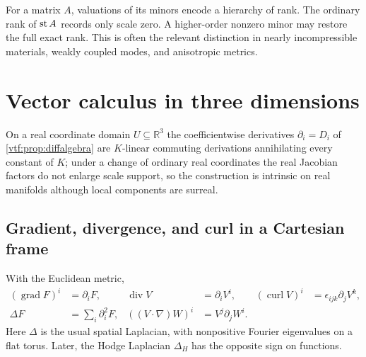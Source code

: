 \documentclass[11pt,letterpaper]{article}
\theoremstyle{definition}
\theoremstyle{remark}
\newcommand{\R}{\mathbb R}\newcommand{\C}{\mathbb C}
\newcommand{\grad}{\operatorname{grad}}\newcommand{\Div}{\operatorname{div}}
\newcommand{\curl}{\operatorname{curl}}
\begin{document}
For a matrix $A$, valuations of its minors encode a hierarchy of rank. The ordinary rank of $\operatorname{st} A$ records only scale zero. A higher-order nonzero minor may restore the full exact rank. This is often the relevant distinction in nearly incompressible materials, weakly coupled modes, and anisotropic metrics.

\section{Vector calculus in three dimensions}\label{vtf:3d:sec:calculus}

On a real coordinate domain $U\subseteq\R^3$ the coefficientwise derivatives
$\partial_i=D_i$ of \cref{vtf:prop:diffalgebra} are $K$-linear commuting
derivations annihilating every constant of $K$; under a change of ordinary real
coordinates the real Jacobian factors do not enlarge scale support, so the
construction is intrinsic on real manifolds although local components are
surreal.

\subsection{Gradient, divergence, and curl in a Cartesian frame}
With the Euclidean metric,
\begin{align}
 (\grad F)^i&=\partial_iF, &
 \Div V&=\partial_iV^i, &
 (\curl V)^i&=\epsilon_{ijk}\partial_jV^k,\label{vtf:3d:eq:operators}\\
 \Delta F&=\sum_i\partial_i^2F, &
 ((V\cdot\nabla)W)^i&=V^j\partial_jW^i.
\end{align}
Here $\Delta$ is the usual spatial Laplacian, with nonpositive Fourier eigenvalues on a flat torus. Later, the Hodge Laplacian $\Delta_H$ has the opposite sign on functions.
\end{document}
